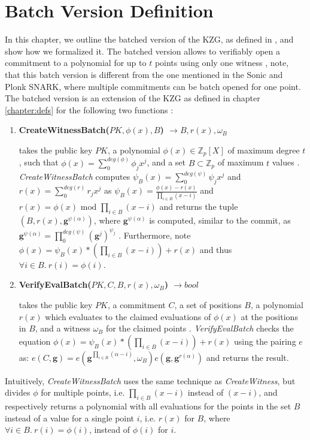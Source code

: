 \chapter{Batch Version Definition}\label{chapter:batch_def}

In this chapter, we outline the batched version of the KZG, as defined in \parencite{KZG}, and show how we formalized it.
The batched version allows to verifiably open a commitment to a polynomial for up to $t$ points using only one witness \parencite{KZG}, note, that this batch version is different from the one mentioned in the Sonic\parencite{sonic} and Plonk\parencite{plonk} SNARK, where multiple commitments can be batch opened for one point. The \parencite{KZG} batched version is an extension of the KZG as defined in chapter \ref{chapter:defs} for the following two functions \parencite{KZG}: 
\begin{enumerate}
    \item \textbf{CreateWitnessBatch($PK,\phi(x),B$) $\rightarrow B,r(x),\omega_B$}
    
    takes the public key $PK$, a polynomial $\phi(x) \in \mathbb{Z}_p[X]$ of maximum degree $t$, such that $\phi(x)=\sum_{0}^{deg(\phi)}\phi_jx^j$, and a set $B\subset\mathbb{Z}_p$ of maximum $t$ values \parencite{KZG}. \textit{CreateWitnessBatch} computes $\psi_B(x)=\sum_{0}^{deg(\psi)}\psi_jx^j$ and $r(x)=\sum_{0}^{deg(r)}r_jx^j$ as $\psi_B(x)=\frac{\phi(x)-r(x)}{\prod_{i\in B}^{}(x-i)}$ and $r(x)= \phi(x) \text{ mod } \prod_{i\in B}^{}(x-i)$ and returns the tuple $(B,r(x),\mathbf{g}^{\psi(\alpha)})$, where $\mathbf{g}^{\psi(\alpha)}$ is computed, similar to the commit, as $\mathbf{g}^{\psi(\alpha)} = \prod_{0}^{deg(\psi)}(\mathbf{g}^j)^{\psi_j}$ \parencite{KZG}. Furthermore, note $\phi(x)=\psi_B(x)*(\prod_{i\in B}^{}(x-i)) + r(x)$ and thus $\forall i\in B.\ r(i)=\phi(i)$.

    \item \textbf{VerifyEvalBatch($PK,C,B,r(x),\omega_B$) $\rightarrow bool$}
    
    takes the public key $PK$, a commitment $C$, a set of positions $B$, a polynomial $r(x)$ which evaluates to the claimed evaluations of $\phi(x)$ at the positions in $B$, and a witness $\omega_B$ for the claimed points \parencite{KZG}. \textit{VerifyEvalBatch} checks the equation $\phi(x)=\psi_B(x)*(\prod_{i\in B}^{}(x-i)) + r(x)$ using the pairing $e$ as: $e(C,\mathbf{g}) = e(\mathbf{g}^{\prod_{i\in B}^{}(\alpha-i)}, \omega_B)e(\mathbf{g},\mathbf{g}^{r(\alpha)})$ and returns the result.


\end{enumerate}
Intuitively, \textit{CreateWitnessBatch} uses the same technique as \textit{CreateWitness}, but divides $\phi$ for multiple points, i.e. $\prod_{i\in B}^{}(x-i)$ instead of $(x-i)$, and respectively returns a polynomial with all evaluations for the points in the set $B$ instead of a value for a single point $i$, i.e. $r(x)$ for $B$, where $\forall i\in B.\ r(i)=\phi(i)$, instead of $\phi(i)$ for $i$.

